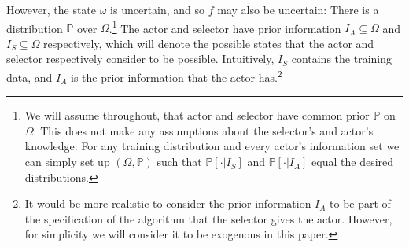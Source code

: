 However, the state $\omega$ is uncertain, and so $f$ may also be uncertain: There is a distribution $\mathbb P$ over $\Omega$.\footnote{We will assume throughout, that actor and selector have common prior $\mathbb P$ on $\Omega$. This does not make any assumptions about the selector's and actor's knowledge: For any training distribution and every actor's information set we can simply set up $(\Omega, \mathbb P)$ such that $\mathbb P[\cdot|I_S]$ and $\mathbb P[\cdot|I_A]$ equal the desired distributions. %
} The actor and selector have prior information $I_A\subseteq \Omega$ and $I_S \subseteq \Omega$ respectively, which will denote the possible states that the actor and selector respectively consider to be possible. Intuitively, $I_S$ contains the training data, and $I_A$ is the prior information that the actor has.\footnote{It would be more realistic to consider the prior information $I_A$ to be part of the specification of the algorithm that the selector gives the actor. However, for simplicity we will consider it to be exogenous in this paper.}

